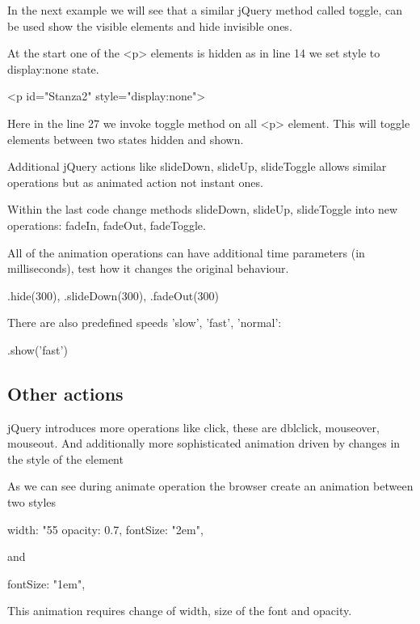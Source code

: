 In the next example we will see that a similar jQuery method called toggle, can be used show the visible elements and hide invisible ones.


\begin{explain}
At the start one of the <p> elements is hidden as in line 14  we set style to display:none state.
\begin{html}
<p id="Stanza2" style="display:none">
\end{html}
Here in the line 27 we invoke toggle method on all <p> element. This will toggle elements between two states hidden and shown.
\end{explain}

Additional jQuery actions like slideDown, slideUp, slideToggle allows similar operations but as animated action not instant ones.


\begin{extercises}
Within the last code change methods slideDown, slideUp, slideToggle into new operations: fadeIn, fadeOut, fadeToggle.
\end{extercises}

\begin{extercises}
All of the animation operations can have additional time parameters (in milliseconds), test how it changes the original behaviour.
\begin{js}
.hide(300),
.slideDown(300),
.fadeOut(300)
\end{js}


There are also predefined speeds 'slow', 'fast', 'normal':
\begin{js}
.show('fast')
\end{js}
\end{extercises}

\subsection{Other actions}
jQuery introduces more operations like click, these are dblclick, mouseover, mouseout. And additionally more sophisticated animation driven by changes in the style of the element


\begin{explain}
  As we can see during animate operation the browser create an animation between two styles
  \begin{js}
    width: "55%
    opacity: 0.7,
    fontSize: "2em",
  \end{js}
   and
  \begin{js}
    fontSize: "1em",
  \end{js}

This animation requires change of width, size of the font and opacity.
\end{explain} 